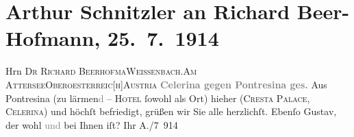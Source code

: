

         
         \renewcommand{\erwaehntePersonen}{Personen: Richard Beer-Hofmann, Gustav Schwarzkopf}
         \renewcommand{\erwaehnteOrte}{Orte: Attersee, Celerina, Cresta Palace, Oberösterreich, Pontresina, Weißenbach am Attersee, Österreich}
         \renewcommand{\erwaehnteWerke}{}
               \section[Arthur Schnitzler an Richard Beer-Hofmann, 25. 7. 1914]{ Arthur Schnitzler an Richard Beer-Hofmann, 25. 7. 1914}\nopagebreak{}\rehead{ }\begin{ledgroupsized}[t]{13cm}\normalsize\beginnumbering \toendnotes[C]{\smallbreak\pagebreak[2]} 
\toendnotes[C]{\smallbreak}\pstart{}{\pb}Hrn \textsc{Dr Richard Beerhofma{\geminationn}}\pend{}\pstart{}\textsc{Weißenbach.}\pend{}\pstart{}\textsc{Am Attersee}\pend{}\pstart{}\textsc{Oberoesterreic{[}h{]}}\pend{}\pstart{}\textsc{Austria}\pend{}{\bigskip}\pstart
           \noindent{}\centering{}{\pb}\textcolor{gray}{\textbf{Celerina gegen Pontresina ges.}}\pend
           \pstart
           {\pb}Aus Pontresina
               (zu lärmen\textcolor{gray}{d} – \textsc{Hotel} ſowohl als Ort)
               hieher \label{K_L02188-1v}\label{K_L02188-1h} (\textsc{Cresta Palace, Celerina}) und höchſt befriedigt, grüßen wir Sie alle {\pb}herzlichſt. Ebenſo Gustav, der wohl
                  \textcolor{gray}{und} bei Ihnen iſt?\pend
           \pstart Ihr \spacefill\mbox{A.}\pend{}/7 914\pend
           
         
         \endnumbering{}\end{ledgroupsized}  \newcommand{\dateiname}{L02188}\newcommand{\titel}{Arthur Schnitzler an Richard Beer-Hofmann, 25. 7. 1914}\newcommand{\editorInnen}{Martin Anton Müller und Gerd-Hermann Susen}
      
